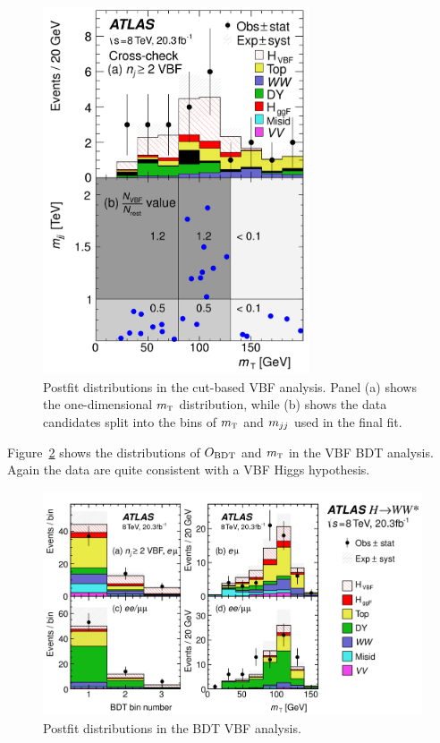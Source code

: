 \begin{figure}[h!]
  \centering
  \captionsetup{justification=centering}
  \includegraphics[width=0.7\textwidth]{figures/VBF_cb_mt}
  \caption{Postfit distributions in the cut-based VBF analysis. Panel (a) shows the one-dimensional $m_{\textrm{\footnotesize\sc t}}$ distribution, while (b) shows the data candidates split into the bins of $m_{\textrm{\footnotesize\sc t}}$ and $m_{jj}$ used in the final fit\cite{WW2015}.}
  \label{fig:vbf_cb_mt}
\end{figure}

Figure~\ref{fig:vbf_bdt_mt} shows the distributions of $O_{\rm BDT}$ and $m_{\textrm{\footnotesize\sc t}}$ in the VBF BDT analysis. Again the data are quite consistent with a VBF Higgs hypothesis. 

\begin{figure}[h!]
  \centering
  \captionsetup{justification=centering}
  \includegraphics[width=\textwidth]{figures/VBF_bdt_mt}
  \caption{Postfit distributions in the BDT VBF analysis\cite{WW2015}.}
  \label{fig:vbf_bdt_mt}
\end{figure}

